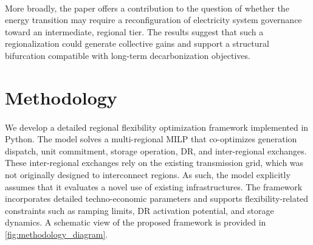 \documentclass[12pt]{article}
\begin{document}
\paragraph{} More broadly, the paper offers a contribution to the question of whether the energy transition may require a reconfiguration of electricity system governance toward an intermediate, regional tier. The results suggest that such a regionalization could generate collective gains and support a structural bifurcation compatible with long-term decarbonization objectives.


\section{Methodology}
\label{sec:method}

\paragraph{}
We develop a detailed regional flexibility optimization framework implemented in Python. The model solves a multi-regional MILP that co-optimizes generation dispatch, unit commitment, storage operation, DR, and inter-regional exchanges. These inter-regional exchanges rely on the existing transmission grid, which was not originally designed to interconnect regions. As such, the model explicitly assumes that it evaluates a novel use of existing infrastructures. The framework incorporates detailed techno-economic parameters and supports flexibility-related constraints such as ramping limits, DR activation potential, and storage dynamics. A schematic view of the proposed framework is provided in \cref{fig:methodology_diagram}.
\end{document}
